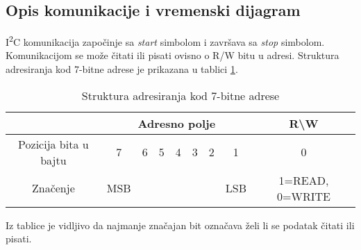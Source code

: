 \subsection{Opis komunikacije i vremenski dijagram}
I\textsuperscript{2}C komunikacija započinje sa \textit{start} simbolom i završava sa \textit{stop} simbolom. Komunikacijom se može čitati ili pisati ovisno o R/W bitu u adresi. Struktura adresiranja kod 7-bitne adrese je prikazana u tablici \ref{Tab:i2c_seven_bit_adressing}.
\begin{center}
	\begin{table}[H]
		\centering
		\begin{tabular}{ | c | c | c | c | c | c | c | c | c | }
			\hline
			& \multicolumn{7}{|c|}{Adresno polje} & R\textbackslash W \\
			\hline
			Pozicija bita u bajtu & 7 & 6 & 5 & 4 & 3 & 2 & 1 & 0 \\
			\hline
			Značenje & MSB & \multicolumn{5}{|c|}{} & LSB & 1=READ, 0=WRITE \\
			\hline
		\end{tabular}
		\caption{Struktura adresiranja kod 7-bitne adrese \cite{i2c_wikipedia}}
		\label{Tab:i2c_seven_bit_adressing}
	\end{table}
\end{center}
Iz tablice je vidljivo da najmanje značajan bit označava želi li se podatak čitati ili pisati.

